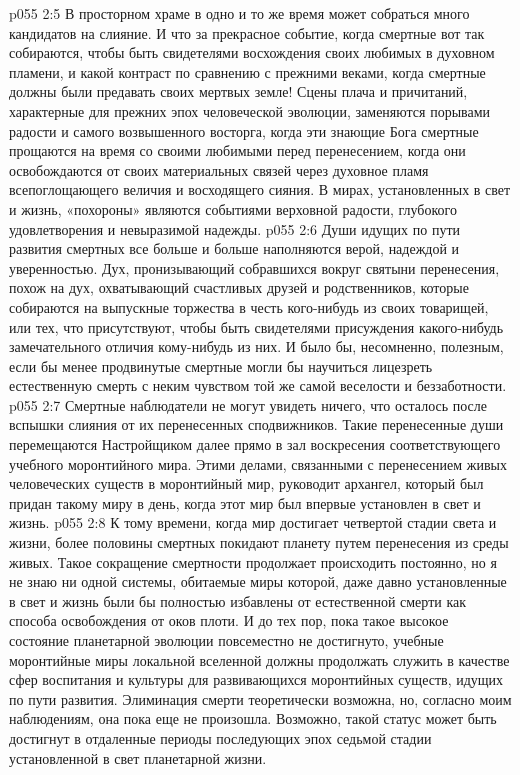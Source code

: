 \vs p055 2:5 В просторном храме в одно и то же время может собраться много кандидатов на слияние. И что за прекрасное событие, когда смертные вот так собираются, чтобы быть свидетелями восхождения своих любимых в духовном пламени, и какой контраст по сравнению с прежними веками, когда смертные должны были предавать своих мертвых земле! Сцены плача и причитаний, характерные для прежних эпох человеческой эволюции, заменяются порывами радости и самого возвышенного восторга, когда эти знающие Бога смертные прощаются на время со своими любимыми перед перенесением, когда они освобождаются от своих материальных связей через духовное пламя всепоглощающего величия и восходящего сияния. В мирах, установленных в свет и жизнь, «похороны» являются событиями верховной радости, глубокого удовлетворения и невыразимой надежды.
\vs p055 2:6 Души идущих по пути развития смертных все больше и больше наполняются верой, надеждой и уверенностью. Дух, пронизывающий собравшихся вокруг святыни перенесения, похож на дух, охватывающий счастливых друзей и родственников, которые собираются на выпускные торжества в честь кого\hyp{}нибудь из своих товарищей, или тех, что присутствуют, чтобы быть свидетелями присуждения какого\hyp{}нибудь замечательного отличия кому\hyp{}нибудь из них. И было бы, несомненно, полезным, если бы менее продвинутые смертные могли бы научиться лицезреть естественную смерть с неким чувством той же самой веселости и беззаботности.
\vs p055 2:7 \pc Смертные наблюдатели не могут увидеть ничего, что осталось после вспышки слияния от их перенесенных сподвижников. Такие перенесенные души перемещаются Настройщиком далее прямо в зал воскресения соответствующего учебного моронтийного мира. Этими делами, связанными с перенесением живых человеческих существ в моронтийный мир, руководит архангел, который был придан такому миру в день, когда этот мир был впервые установлен в свет и жизнь.
\vs p055 2:8 К тому времени, когда мир достигает четвертой стадии света и жизни, более половины смертных покидают планету путем перенесения из среды живых. Такое сокращение смертности продолжает происходить постоянно, но я не знаю ни одной системы, обитаемые миры которой, даже давно установленные в свет и жизнь были бы полностью избавлены от естественной смерти как способа освобождения от оков плоти. И до тех пор, пока такое высокое состояние планетарной эволюции повсеместно не достигнуто, учебные моронтийные миры локальной вселенной должны продолжать служить в качестве сфер воспитания и культуры для развивающихся моронтийных существ, идущих по пути развития. Элиминация смерти теоретически возможна, но, согласно моим наблюдениям, она пока еще не произошла. Возможно, такой статус может быть достигнут в отдаленные периоды последующих эпох седьмой стадии установленной в свет планетарной жизни.
